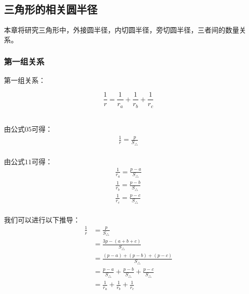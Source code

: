 \documentclass[UTF8]{ctexart}
\begin{document}
\newpage

\subsection{三角形的相关圆半径}
    本章将研究三角形中，外接圆半径，内切圆半径，旁切圆半径，三者间的数量关系。

\subsubsection{第一组关系}
    第一组关系：
    \begin{large}
        \begin{equation*}
            \frac{1}{r}=\frac{1}{r_a}+\frac{1}{r_b}+\frac{1}{r_c}
        \end{equation*}
    \end{large}\\
    由公式$05$可得：
    \setcounter{equation}{0}
    \begin{align}
        \frac{1}{r}=\frac{p}{S_{\triangle}}
    \end{align}\\
    由公式$11$可得：
    \begin{align}
        \frac{1}{r_a}=\frac{p-a}{S_{\triangle}}\\[3mm]
        \frac{1}{r_b}=\frac{p-b}{S_{\triangle}}\\[3mm]
        \frac{1}{r_c}=\frac{p-c}{S_{\triangle}}
    \end{align}\\
    我们可以进行以下推导：
    \begin{align}
        \frac{1}{r}
        &=\frac{p}{S_{\triangle}}\\[3mm]
        &=\frac{3p-(a+b+c)}{S_{\triangle}}\\[3mm]
        &=\frac{(p-a)+(p-b)+(p-c)}{S_{\triangle}}\\[3mm]
        &=\frac{p-a}{S_{\triangle}}+\frac{p-b}{S_{\triangle}}+\frac{p-c}{S_{\triangle}}\\[3mm]
        &=\frac{1}{r_a}+\frac{1}{r_b}+\frac{1}{r_c}
    \end{align}

\newpage
\end{document}
